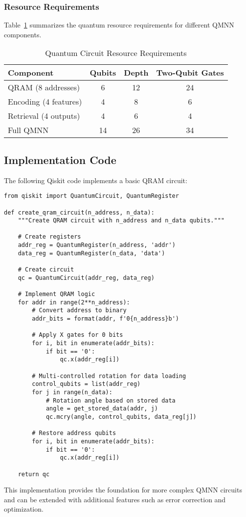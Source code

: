 \subsubsection{Resource Requirements}

Table~\ref{tab:circuit_resources} summarizes the quantum resource requirements for different QMNN components.

\begin{table}[htbp]
    \centering
    \caption{Quantum Circuit Resource Requirements}
    \label{tab:circuit_resources}
    \begin{tabular}{lccc}
        \toprule
        Component & Qubits & Depth & Two-Qubit Gates \\
        \midrule
        QRAM (8 addresses) & 6 & 12 & 24 \\
        Encoding (4 features) & 4 & 8 & 6 \\
        Retrieval (4 outputs) & 4 & 6 & 4 \\
        Full QMNN & 14 & 26 & 34 \\
        \bottomrule
    \end{tabular}
\end{table}

\subsection{Implementation Code}

The following Qiskit code implements a basic QRAM circuit:

\begin{verbatim}
from qiskit import QuantumCircuit, QuantumRegister

def create_qram_circuit(n_address, n_data):
    """Create QRAM circuit with n_address and n_data qubits."""
    
    # Create registers
    addr_reg = QuantumRegister(n_address, 'addr')
    data_reg = QuantumRegister(n_data, 'data')
    
    # Create circuit
    qc = QuantumCircuit(addr_reg, data_reg)
    
    # Implement QRAM logic
    for addr in range(2**n_address):
        # Convert address to binary
        addr_bits = format(addr, f'0{n_address}b')
        
        # Apply X gates for 0 bits
        for i, bit in enumerate(addr_bits):
            if bit == '0':
                qc.x(addr_reg[i])
        
        # Multi-controlled rotation for data loading
        control_qubits = list(addr_reg)
        for j in range(n_data):
            # Rotation angle based on stored data
            angle = get_stored_data(addr, j)
            qc.mcry(angle, control_qubits, data_reg[j])
        
        # Restore address qubits
        for i, bit in enumerate(addr_bits):
            if bit == '0':
                qc.x(addr_reg[i])
    
    return qc
\end{verbatim}

This implementation provides the foundation for more complex QMNN circuits and can be extended with additional features such as error correction and optimization.
